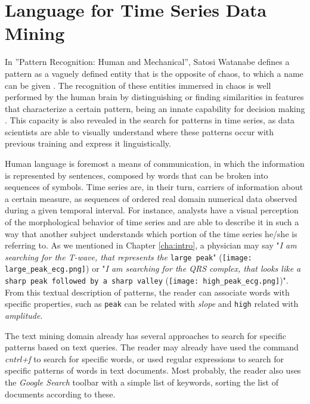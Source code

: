 
%

\chapter{Language for Time Series Data Mining}
\label{cha:text_}

In ”Pattern Recognition: Human and Mechanical”, Satosi Watanabe defines a pattern as a vaguely defined entity that is the opposite of chaos, to which a name can be given \cite{watanabe}. The recognition of these entities immersed in chaos is well performed by the human brain by distinguishing or finding similarities in features that characterize a certain pattern, being an innate capability for decision making \cite{niesser}. This capacity is also revealed in the search for patterns in time series, as data scientists are able to visually understand where these patterns occur with previous training and express it linguistically. 
\par
Human language is foremost a means of communication, in which the information is represented by sentences, composed by words that can be broken into sequences of symbols. Time series are, in their turn, carriers of information about a certain measure, as sequences of ordered real domain numerical data observed during a given temporal interval. For instance, analysts have a visual perception of the morphological behavior of time series and are able to describe it in such a way that another subject understands which portion of the time series he/she is referring to. As we mentioned in Chapter \ref{cha:intro}, a physician may say "\textit{I am searching for the T-wave, that represents the} \texttt{large peak}" (\texttt{[image: large\_peak\_ecg.png]}) or "\textit{I am searching for the QRS complex, that looks like a} \texttt{sharp peak followed by a sharp valley} (\texttt{[image: high\_peak\_ecg.png]})". From this textual description of patterns, the reader can associate words with specific properties, such as \texttt{peak} can be related with \textit{slope} and \texttt{high} related with \textit{amplitude}.
\par
The text mining domain already has several approaches to search for specific patterns based on text queries. The reader may already have used the command \textit{cntrl+f} to search for specific words, or used regular expressions to search for specific patterns of words in text documents. Most probably, the reader also uses the \textit{Google Search} toolbar with a simple list of keywords, sorting the list of documents according to these.
